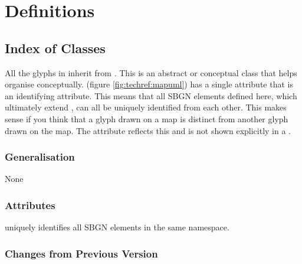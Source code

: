 
\section{Definitions}
\label{sec:techref:definitions}

\subsection{Index of Classes}

\printindex

\label{defn:SBGNElement}

All the glyphs in \SBGNPDLone inherit from
. This is an abstract or conceptual class that
helps organise \PD conceptually.  (figure
\ref{fig:techref:mapuml}) has a single attribute  that is an
identifying attribute. This means that all SBGN elements defined here,
which ultimately extend , can all be uniquely
identified from each other. This makes sense if you think that a glyph
drawn on a map is distinct from another glyph drawn on the map. The
 attribute reflects this and is not shown explicitly in a
\PDm.

\subsubsection{Generalisation}

None

\subsubsection{Attributes}

\begin{attributes}
   uniquely identifies all SBGN elements in
  the same namespace.
\end{attributes}

\subsubsection{Changes from Previous Version}


